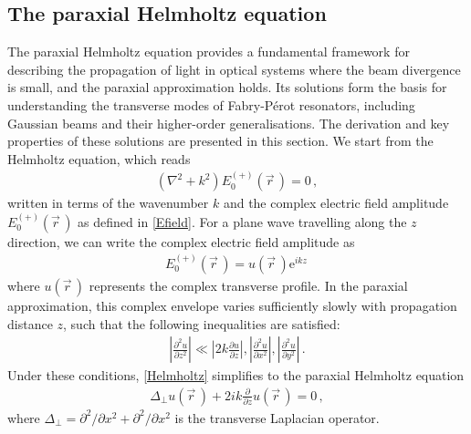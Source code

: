 \documentclass[../Thesis-IJspeert.tex]{subfiles}
\begin{document}
\subsection{The paraxial Helmholtz equation}
The paraxial Helmholtz equation provides a fundamental framework for describing the propagation of light in optical systems where the beam divergence is small, and the paraxial approximation holds. Its solutions form the basis for understanding the transverse modes of Fabry-Pérot resonators, including Gaussian beams and their higher-order generalisations. The derivation and key properties of these solutions are presented in this section. We start from the Helmholtz equation, which reads
\begin{align}
\label{Helmholtz}
\left(\nabla^2 + k^2\right) E_0^{(+)}(\vec{r}\,)=0\,,
\end{align}
written in terms of the wavenumber $k$ and the complex electric field amplitude $E_0^{(+)}(\vec{r}\,)$ as defined in \autoref{Efield}. For a plane wave travelling along the $z$ direction, we can write the complex electric field amplitude as
\begin{align}
E_0^{(+)}(\vec{r}\,)=u(\vec{r}\,)\mathrm{e}^{ikz}\,
\end{align}
where $u(\vec{r}\,)$ represents the complex transverse profile. In the paraxial approximation, this complex envelope varies sufficiently slowly with propagation distance $z$, such that the following inequalities are satisfied:
\begin{align}
\left\lvert \frac{\partial^2 u}{\partial z^2} \right\rvert \ll  \left\lvert 2k \frac{\partial u}{\partial z}\right\rvert , \left\lvert \frac{\partial^2 u}{\partial x^2} \right\rvert, \left\lvert \frac{\partial^2 u}{\partial y^2} \right\rvert \,.
\end{align}
Under these conditions, \autoref{Helmholtz} simplifies to the paraxial Helmholtz equation
\begin{align}
\label{paraxialHelmholtz}
\Delta_\perp u(\vec{r}\,)+2ik\frac{\partial}{\partial z}u(\vec{r}\,)=0\,,
\end{align}
where $\Delta_\perp={\partial^2}/{\partial x^2} + {\partial^2}/{\partial x^2}$ is the transverse Laplacian operator.
\end{document}
